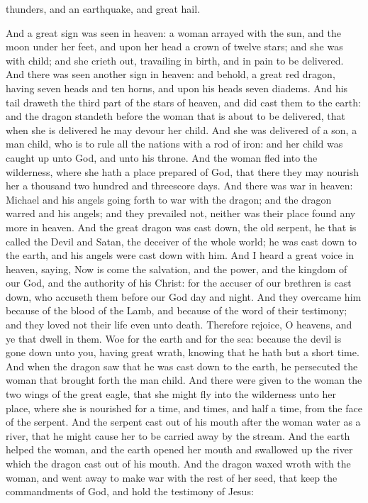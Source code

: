 thunders, and an earthquake, and great hail. 

And a great sign was seen in heaven: a woman arrayed with the sun, and the moon under her feet, and upon her head a crown of twelve stars; and she was with child; and she crieth out, travailing in birth, and in pain to be delivered. And there was seen another sign in heaven: and behold, a great red dragon, having seven heads and ten horns, and upon his heads seven diadems. And his tail draweth the third part of the stars of heaven, and did cast them to the earth: and the dragon standeth before the woman that is about to be delivered, that when she is delivered he may devour her child. And she was delivered of a son, a man child, who is to rule all the nations with a rod of iron: and her child was caught up unto God, and unto his throne. And the woman fled into the wilderness, where she hath a place prepared of God, that there they may nourish her a thousand two hundred and threescore days.  And there was war in heaven: Michael and his angels going forth to war with the dragon; and the dragon warred and his angels; and they prevailed not, neither was their place found any more in heaven. And the great dragon was cast down, the old serpent, he that is called the Devil and Satan, the deceiver of the whole world; he was cast down to the earth, and his angels were cast down with him. And I heard a great voice in heaven, saying, Now is come the salvation, and the power, and the kingdom of our God, and the authority of his Christ: for the accuser of our brethren is cast down, who accuseth them before our God day and night. And they overcame him because of the blood of the Lamb, and because of the word of their testimony; and they loved not their life even unto death. Therefore rejoice, O heavens, and ye that dwell in them. Woe for the earth and for the sea: because the devil is gone down unto you, having great wrath, knowing that he hath but a short time.  And when the dragon saw that he was cast down to the earth, he persecuted the woman that brought forth the man child. And there were given to the woman the two wings of the great eagle, that she might fly into the wilderness unto her place, where she is nourished for a time, and times, and half a time, from the face of the serpent. And the serpent cast out of his mouth after the woman water as a river, that he might cause her to be carried away by the stream. And the earth helped the woman, and the earth opened her mouth and swallowed up the river which the dragon cast out of his mouth. And the dragon waxed wroth with the woman, and went away to make war with the rest of her seed, that keep the commandments of God, and hold the testimony of Jesus: 

